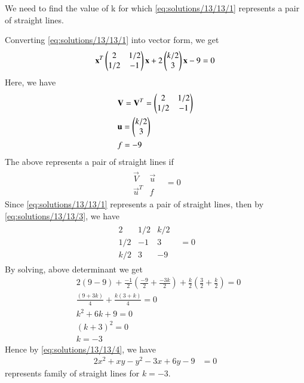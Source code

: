 We need to find the value of k for which \eqref{eq:solutions/13/13/1} represents a pair of straight lines.

Converting \eqref{eq:solutions/13/13/1} into vector form, we get
\begin{align}
	\mathbf{x}^T\begin{pmatrix}2 & 1/2 \\ 1/2 & -1\end{pmatrix}\mathbf{x}+2\begin{pmatrix}k/2 \\ 3\end{pmatrix}\mathbf{x}-9=0 \label{eq:solutions/13/13/2}
\end{align} 
Here, we have
\begin{align}
& \mathbf{V} = \mathbf{V}^T = \begin{pmatrix}2 & 1/2 \\ 1/2 & -1\end{pmatrix} \\
& \mathbf{u} = \begin{pmatrix}k/2 \\ 3\end{pmatrix} \\
& f = -9
\end{align}
The above represents a pair of straight lines if
\begin{align}
	\begin{array}{|cc|}
		\vec{V} & \vec{u}\\\vec{u}^T & f
	\end{array}&=0\label{eq:solutions/13/13/3}
\end{align}
Since \eqref{eq:solutions/13/13/1} represents a pair of straight lines, then by \eqref{eq:solutions/13/13/3}, we have
\begin{align}
	\begin{array}{|ccc|}
		2 & 1/2 & k/2 \\ 1/2 & -1 & 3  \\ k/2 & 3 & -9 
	\end{array}&=0
\end{align}
By solving, above determinant we get
\begin{align}
& 2(9-9) + \frac{-1}{2}(\frac{-9}{2} + \frac{-3k}{2}) + \frac{k}{2}(\frac{3}{2} + \frac{k}{2})  = 0\\
& \frac{(9+3k)}{4} + \frac{k(3+k)}{4}  = 0 \\
& k^2 + 6k + 9 =0 \\
& (k+3)^2 = 0 \\
& k = -3 \label{eq:solutions/13/13/4}
\end{align}
Hence by \eqref{eq:solutions/13/13/4}, we have
\begin{align}
   2x^2+ xy -y^2 - 3x + 6y - 9 &= 0
\end{align} 
represents family of straight lines for $k=-3$.


